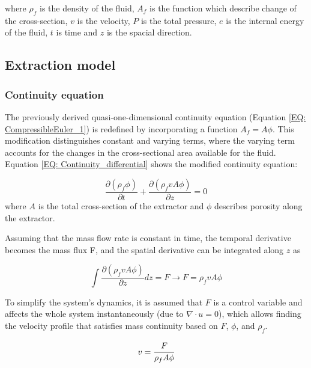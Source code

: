 \documentclass[../Article_Model_Parameters.tex]{subfiles}
\begin{document}
	where $\rho_f$ is the density of the fluid, $A_f$ is the function which describe change of the cross-section, $v$ is the velocity, $P$ is the total pressure, $e$ is the internal energy of the fluid, $t$ is time and $z$ is the spacial direction.
	
	\subsection{Extraction model} \label{CH: Extraction_model}
	\subsubsection{Continuity equation} \label{CH: Continuity}
	
	The previously derived quasi-one-dimensional continuity equation (Equation \ref{EQ: CompressibleEuler_1}) is redefined by incorporating a function $A_f = A\phi$. This modification distinguishes constant and varying terms, where the varying term accounts for the changes in the cross-sectional area available for the fluid. Equation \ref{EQ: Continuity_differential} shows the modified continuity equation:
	
	{\footnotesize
		\begin{equation} \label{EQ: Continuity_differential}
			\frac{\partial (\rho_f \phi)}{\partial t} + \frac{\partial (\rho_f v A\phi)}{\partial z} = 0
		\end{equation}
	}
	where $A$ is the total cross-section of the extractor and $\phi$ describes porosity along the extractor.
	
	Assuming that the mass flow rate is constant in time, the temporal derivative becomes the mass flux F, and the spatial derivative can be integrated along $z$ as
	
	{\footnotesize
		\begin{equation}
			\int \frac{\partial (\rho_f v A \phi )}{\partial z} dz = F \rightarrow F=\rho_f v A\phi
		\end{equation}
	}
	
	To simplify the system's dynamics, it is assumed that $F$ is a control variable and affects the whole system instantaneously (due to $\nabla \cdot u = 0$), which allows finding the velocity profile that satisfies mass continuity based on $F$, $\phi$, and $\rho_f$.
	
	{\footnotesize
		\begin{equation} \label{EQ:Velocity_1}
			v = \cfrac{F}{\rho_f A\phi} 
		\end{equation}
	}
	
\end{document}

